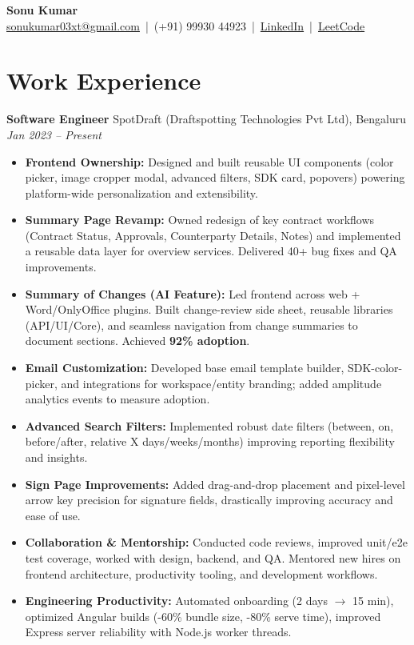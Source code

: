 \documentclass[a4paper,10pt]{article}
\begin{document}
\begin{center}
    {\LARGE \textbf{Sonu Kumar}} \\[4pt]
    \href{mailto:sonukumar03xt@gmail.com}{sonukumar03xt@gmail.com} \,|\, (+91) 99930 44923 \,|\, 
    \href{https://www.linkedin.com/in/sonukumar03xt}{LinkedIn} \,|\, 
    \href{https://leetcode.com/sonukumar03xt}{LeetCode}
\end{center}

\section*{Work Experience}

\textbf{Software Engineer} \hfill SpotDraft (Draftspotting Technologies Pvt Ltd), Bengaluru \\
\textit{Jan 2023 -- Present}
\begin{itemize}
    \item \textbf{Frontend Ownership:} Designed and built reusable UI components (color picker, image cropper modal, advanced filters, SDK card, popovers) powering platform-wide personalization and extensibility.
    \item \textbf{Summary Page Revamp:} Owned redesign of key contract workflows (Contract Status, Approvals, Counterparty Details, Notes) and implemented a reusable data layer for overview services. Delivered 40+ bug fixes and QA improvements.
    \item \textbf{Summary of Changes (AI Feature):} Led frontend across web + Word/OnlyOffice plugins. Built change-review side sheet, reusable libraries (API/UI/Core), and seamless navigation from change summaries to document sections. Achieved \textbf{92\% adoption}.
    \item \textbf{Email Customization:} Developed base email template builder, SDK-color-picker, and integrations for workspace/entity branding; added amplitude analytics events to measure adoption.
    \item \textbf{Advanced Search Filters:} Implemented robust date filters (between, on, before/after, relative X days/weeks/months) improving reporting flexibility and insights.
    \item \textbf{Sign Page Improvements:} Added drag-and-drop placement and pixel-level arrow key precision for signature fields, drastically improving accuracy and ease of use.
    \item \textbf{Collaboration \& Mentorship:} Conducted code reviews, improved unit/e2e test coverage, worked with design, backend, and QA. Mentored new hires on frontend architecture, productivity tooling, and development workflows.
    \item \textbf{Engineering Productivity:} Automated onboarding (2 days $\rightarrow$ 15 min), optimized Angular builds (-60\% bundle size, -80\% serve time), improved Express server reliability with Node.js worker threads.
\end{itemize}
\end{document}
